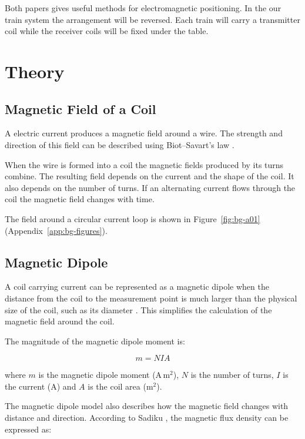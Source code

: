 Both papers gives useful methods for electromagnetic positioning. In the our train system 
the arrangement will be reversed. Each train will carry a transmitter coil while the receiver coils will be 
fixed under the table.




\section{Theory}\label{sec:bg-1-2}
\subsection{Magnetic Field of a Coil}\label{sec:bg-1-2-1}

A electric current produces a magnetic field around a wire. The strength and direction of this field can be 
described using Biot--Savart's law \cite{sadiku2018elements}.

When the wire is formed into a coil the magnetic fields produced by its turns combine. The resulting field depends 
on the current and the shape of the coil. It also depends on the number of turns. If an alternating current flows 
through the coil the magnetic field changes with time.

The field around a circular current loop is shown in Figure~\ref{fig:bg-a01} (Appendix~\ref{app:bg-figures}).



\subsection{Magnetic Dipole} \label{sec:bg-1-2-2}

A coil carrying current can be represented as a magnetic dipole when the distance from the coil to the measurement point is much larger than
the physical size of the coil, such as its diameter \cite{sadiku2018elements}. This simplifies the calculation of the magnetic field around the coil.

The magnitude of the magnetic dipole moment is:

\begin{equation}
    m = NIA
\end{equation}

where $m$ is the magnetic dipole moment
($\mathrm{A\,m^2}$), $N$ is the number of turns,
$I$ is the current (A) and $A$ is the coil area
($\mathrm{m^2}$).

The magnetic dipole model also describes how the magnetic field changes with distance and direction.
According to Sadiku \cite{sadiku2018elements}, the magnetic flux density can be expressed as:

